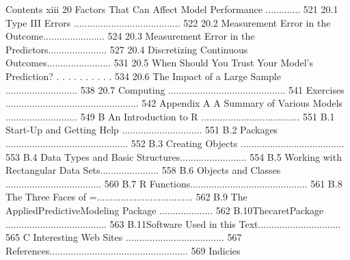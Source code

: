 Contents xiii
20 Factors That Can Affect Model Performance ............. 521 20.1 Type III Errors ........................................ 522 20.2 Measurement Error in the Outcome....................... 524 20.3 Measurement Error in the Predictors...................... 527 20.4 Discretizing Continuous Outcomes........................ 531 20.5 When Should You Trust Your Model’s Prediction? . . . . . . . . . . 534 20.6 The Impact of a Large Sample ........................... 538 20.7 Computing ............................................ 541 Exercises .................................................. 542
Appendix
A A Summary of Various Models ........................... 549
B An Introduction to R ..................................... 551
B.1 Start-Up and Getting Help .............................. 551
B.2 Packages .............................................. 552
B.3 Creating Objects ....................................... 553
B.4 Data Types and Basic Structures......................... 554
B.5 Working with Rectangular Data Sets...................... 558
B.6 Objects and Classes .................................... 560
B.7 R Functions............................................ 561
B.8 The Three Faces of =.................................... 562
B.9 The AppliedPredictiveModeling Package .................... 562
B.10ThecaretPackage ...................................... 563 B.11Software Used in this Text............................... 565
C Interesting Web Sites ..................................... 567
References.................................................... 569 Indicies
